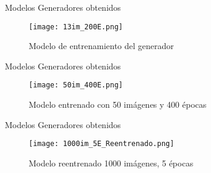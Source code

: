 \begin{frame}{Modelos Generadores obtenidos}
    
    \begin{figure}[H]
        \begin{center}
          \texttt{[image: 13im\_200E.png]}
          \caption{Modelo de entrenamiento del generador}
          \label{Alexis6}
        \end{center}
    \end{figure}
    
\end{frame}

\begin{frame}{Modelos Generadores obtenidos}
    
    \begin{figure}[H]
        \begin{center}
          \texttt{[image: 50im\_400E.png]}
          \caption{Modelo entrenado con 50 imágenes y 400 épocas}
          \label{Alexis7}
        \end{center}
    \end{figure}
     
\end{frame}


\begin{frame}{Modelos Generadores obtenidos}
    
    \begin{figure}[H]
        \begin{center}
          \texttt{[image: 1000im\_5E\_Reentrenado.png]}
          \caption{Modelo reentrenado 1000 imágenes, 5 épocas}
          \label{Alexis8}
        \end{center}
    \end{figure}
     
\end{frame}
